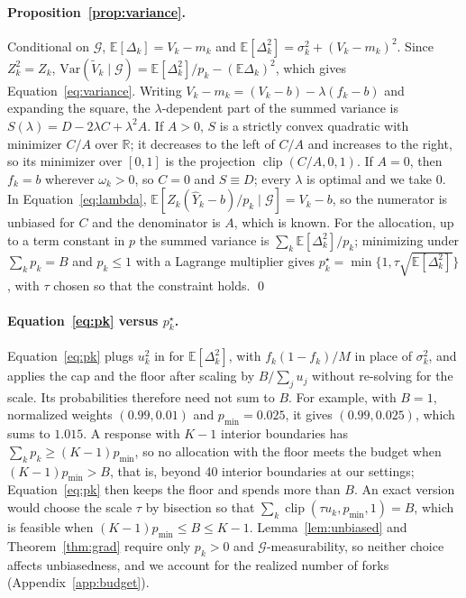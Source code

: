 \documentclass[11pt]{article}
\newcommand{\Vt}{\tilde V}
\newcommand{\Yh}{\hat Y}
\newcommand{\E}{\mathbb{E}}
\newcommand{\Var}{\mathrm{Var}}
\newcommand{\G}{\mathcal{G}}
\newcommand{\clip}{\operatorname{clip}}
\theoremstyle{remark}
\begin{document}
\paragraph{Proposition~\ref{prop:variance}.}
Conditional on $\G$, $\E[\Delta_k]=V_k-m_k$ and $\E[\Delta_k^2]=\sigma_k^2+(V_k-m_k)^2$. Since $Z_k^2=Z_k$, $\Var(\Vt_k\mid\G)=\E[\Delta_k^2]/p_k-(\E \Delta_k)^2$, which gives Equation~\eqref{eq:variance}. Writing $V_k-m_k=(V_k-b)-\lambda(f_k-b)$ and expanding the square, the $\lambda$-dependent part of the summed variance is $S(\lambda)=D-2\lambda C+\lambda^2A$. If $A>0$, $S$ is a strictly convex quadratic with minimizer $C/A$ over $\mathbb{R}$; it decreases to the left of $C/A$ and increases to the right, so its minimizer over $[0,1]$ is the projection $\clip(C/A,0,1)$. If $A=0$, then $f_k=b$ wherever $\omega_k>0$, so $C=0$ and $S\equiv D$; every $\lambda$ is optimal and we take $0$. In Equation~\eqref{eq:lambda}, $\E[Z_k(\Yh_k-b)/p_k\mid\G]=V_k-b$, so the numerator is unbiased for $C$ and the denominator is $A$, which is known. For the allocation, up to a term constant in $p$ the summed variance is $\sum_k\E[\Delta_k^2]/p_k$; minimizing under $\sum_k p_k=B$ and $p_k\le1$ with a Lagrange multiplier gives $p_k^\star=\min\{1,\tau\sqrt{\E[\Delta_k^2]}\}$, with $\tau$ chosen so that the constraint holds. \qed

\paragraph{Equation~\eqref{eq:pk} versus $p_k^\star$.}
Equation~\eqref{eq:pk} plugs $u_k^2$ in for $\E[\Delta_k^2]$, with $f_k(1-f_k)/M$ in place of $\sigma_k^2$, and applies the cap and the floor after scaling by $B/\sum_ju_j$ without re-solving for the scale. Its probabilities therefore need not sum to $B$. For example, with $B=1$, normalized weights $(0.99,0.01)$ and $p_{\min}=0.025$, it gives $(0.99,0.025)$, which sums to $1.015$. A response with $K-1$ interior boundaries has $\sum_kp_k\ge(K-1)p_{\min}$, so no allocation with the floor meets the budget when $(K-1)p_{\min}>B$, that is, beyond 40 interior boundaries at our settings; Equation~\eqref{eq:pk} then keeps the floor and spends more than $B$. An exact version would choose the scale $\tau$ by bisection so that $\sum_k\clip(\tau u_k,p_{\min},1)=B$, which is feasible when $(K-1)p_{\min}\le B\le K-1$. Lemma~\ref{lem:unbiased} and Theorem~\ref{thm:grad} require only $p_k>0$ and $\G$-measurability, so neither choice affects unbiasedness, and we account for the realized number of forks (Appendix~\ref{app:budget}).
\end{document}
